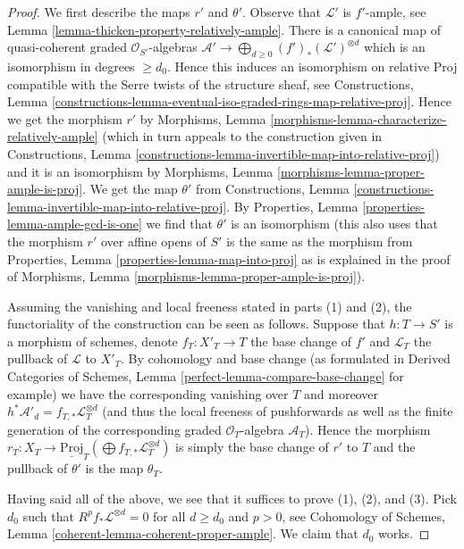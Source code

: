\begin{proof}
We first describe the maps $r'$ and $\theta'$.
Observe that $\mathcal{L}'$ is $f'$-ample, see
Lemma \ref{lemma-thicken-property-relatively-ample}.
There is a canonical map of quasi-coherent graded
$\mathcal{O}_{S'}$-algebras
$\mathcal{A}' \to \bigoplus_{d \geq 0} (f')_*(\mathcal{L}')^{\otimes d}$
which is an isomorphism in degrees $\geq d_0$.
Hence this induces an isomorphism on relative Proj
compatible with the Serre twists of the structure sheaf, see
Constructions, Lemma
\ref{constructions-lemma-eventual-iso-graded-rings-map-relative-proj}.
Hence we get the morphism $r'$ by
Morphisms, Lemma \ref{morphisms-lemma-characterize-relatively-ample}
(which in turn appeals to the construction given in
Constructions, Lemma
\ref{constructions-lemma-invertible-map-into-relative-proj})
and it is an isomorphism by
Morphisms, Lemma \ref{morphisms-lemma-proper-ample-is-proj}.
We get the map $\theta'$ from Constructions, Lemma
\ref{constructions-lemma-invertible-map-into-relative-proj}.
By Properties, Lemma \ref{properties-lemma-ample-gcd-is-one}
we find that $\theta'$ is an isomorphism
(this also uses that the morphism $r'$ over affine
opens of $S'$ is the same as the morphism from
Properties, Lemma \ref{properties-lemma-map-into-proj}
as is explained in the proof
of Morphisms, Lemma \ref{morphisms-lemma-proper-ample-is-proj}).

\medskip\noindent
Assuming the vanishing and local freeness stated in parts
(1) and (2), the functoriality of the construction can be seen as follows.
Suppose that $h : T \to S'$ is a morphism of schemes, denote
$f_T : X'_T \to T$ the base change of $f'$ and
$\mathcal{L}_T$ the pullback of $\mathcal{L}$ to $X'_T$.
By cohomology and base change
(as formulated in Derived Categories of Schemes,
Lemma \ref{perfect-lemma-compare-base-change} for example)
we have the corresponding vanishing over $T$ and moreover
$h^*\mathcal{A}'_d = f_{T, *}\mathcal{L}_T^{\otimes d}$
(and thus the local freeness of pushforwards as well
as the finite generation of the corresponding graded
$\mathcal{O}_T$-algebra $\mathcal{A}_T$).
Hence the morphism
$r_T : X_T \to
\underline{\text{Proj}}_T(\bigoplus f_{T, *}\mathcal{L}_T^{\otimes d})$
is simply the base change of $r'$ to $T$ and the pullback of
$\theta'$ is the map $\theta_T$.

\medskip\noindent
Having said all of the above, we see that it suffices to prove
(1), (2), and (3). Pick $d_0$ such that
$R^pf_*\mathcal{L}^{\otimes d} = 0$ for all $d \geq d_0$ and $p > 0$, see
Cohomology of Schemes, Lemma \ref{coherent-lemma-coherent-proper-ample}.
We claim that $d_0$ works.


\end{proof}
